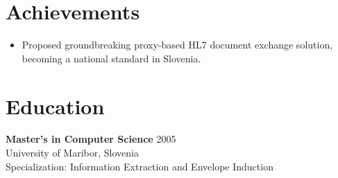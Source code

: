 \documentclass[11pt]{article}
\begin{document}
\section*{Achievements}
\begin{itemize}
    \item Proposed groundbreaking proxy-based HL7 document exchange solution, becoming a national standard in Slovenia.
\end{itemize}

\section*{Education}
\textbf{Master's in Computer Science} \hfill 2005\\
University of Maribor, Slovenia\\
Specialization: Information Extraction and Envelope Induction
\end{document}

